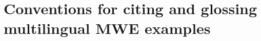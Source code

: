 \documentclass[output=paper,modfonts,]{langscibook}
\begin{document}





\section{Conventions for citing and glossing multilingual MWE examples}
\end{document}
